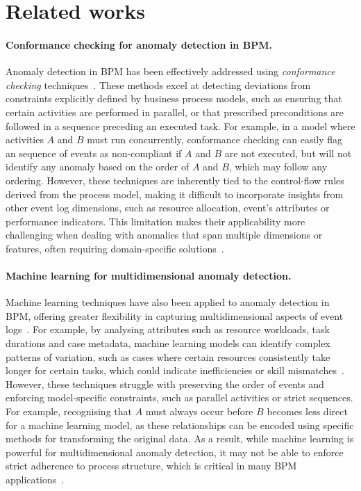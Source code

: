 \section{Related works}
\label{s:rw}
\paragraph{Conformance checking for anomaly detection in BPM.}
Anomaly detection in BPM has been effectively addressed using \textit{conformance checking} techniques~\cite{Dunzer2019}. These methods excel at detecting deviations from constraints explicitly defined by business process models, such as ensuring that certain activities are performed in parallel, or that prescribed preconditions are followed in a sequence preceding an executed task. For example, in a model where activities $A$ and $B$ must run concurrently, conformance checking can easily flag an sequence of events as non-compliant if $A$ and $B$ are not executed, but will not identify any anomaly based on the order of $A$ and $B$, which may follow any ordering. However, these techniques are inherently tied to the control-flow rules derived from the process model, making it difficult to incorporate insights from other event log dimensions, such as resource allocation, event's attributes or performance indicators. This limitation makes their applicability more challenging when dealing with anomalies that span multiple dimensions or features, often requiring domain-specific solutions~\cite{Carmona2022}.

\paragraph{Machine learning for multidimensional anomaly detection.}
Machine learning techniques have also been applied to anomaly detection in BPM, offering greater flexibility in capturing multidimensional aspects of event logs~\cite{Barbon2020}. For example, by analysing attributes such as resource workloads, task durations and case metadata, machine learning models can identify complex patterns of variation, such as cases where certain resources consistently take longer for certain tasks, which could indicate inefficiencies or skill mismatches~\cite{Pasquadibisceglie2021}. However, these techniques struggle with preserving the order of events and enforcing model-specific constraints, such as parallel activities or strict sequences. For example, recognising that $A$ must always occur before $B$ becomes less direct for a machine learning model, as these relationships can be encoded using specific methods for transforming the original data. As a result, while machine learning is powerful for multidimensional anomaly detection, it may not be able to enforce strict adherence to process structure, which is critical in many BPM applications~\cite{Peeperkorn2023}.

